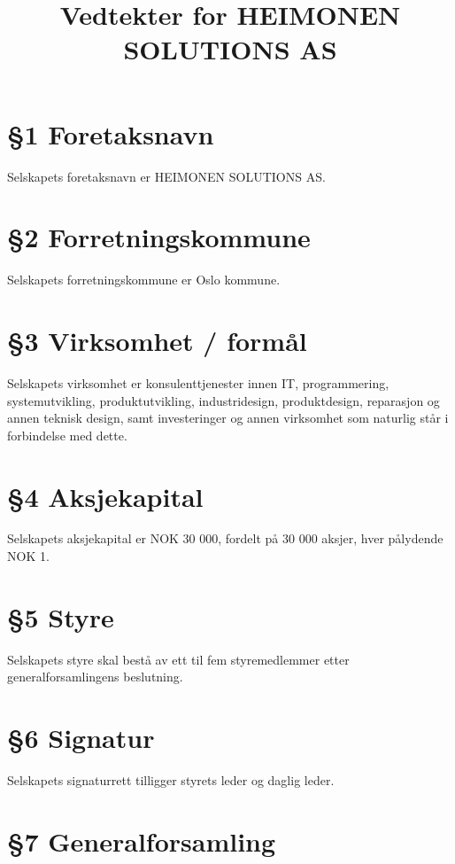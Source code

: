 \documentclass[12pt,a4paper]{article}
\title{Vedtekter for HEIMONEN SOLUTIONS AS}
\date{}
\begin{document}
\maketitle

\section*{\S 1 Foretaksnavn}

Selskapets foretaksnavn er HEIMONEN SOLUTIONS AS.

\section*{\S 2 Forretningskommune}

Selskapets forretningskommune er Oslo kommune.

\section*{\S 3 Virksomhet / formål}

Selskapets virksomhet er konsulenttjenester innen IT, programmering, systemutvikling, produktutvikling, industridesign, produktdesign, reparasjon og annen teknisk design, samt investeringer og annen virksomhet som naturlig står i forbindelse med dette.

\section*{\S 4 Aksjekapital}

Selskapets aksjekapital er NOK 30 000, fordelt på 30 000 aksjer, hver pålydende NOK 1.

\section*{\S 5 Styre}

Selskapets styre skal bestå av ett til fem styremedlemmer etter generalforsamlingens beslutning.

\section*{\S 6 Signatur}

Selskapets signaturrett tilligger styrets leder og daglig leder.

\section*{\S 7 Generalforsamling}
\end{document}
